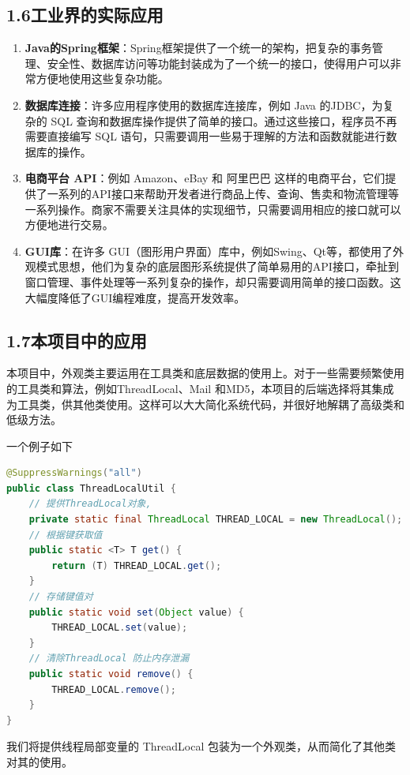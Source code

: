 \documentclass[24pt,a4paper]{article}%
\begin{document}
\subsection*{\songti 1.6工业界的实际应用}
\begin{enumerate}
    \item \textbf{Java的Spring框架}：Spring框架提供了一个统一的架构，把复杂的事务管理、安全性、数据库访问等功能封装成为了一个统一的接口，使得用户可以非常方便地使用这些复杂功能。
    \item \textbf{数据库连接}：许多应用程序使用的数据库连接库，例如 Java 的JDBC，为复杂的 SQL 查询和数据库操作提供了简单的接口。通过这些接口，程序员不再需要直接编写 SQL 语句，只需要调用一些易于理解的方法和函数就能进行数据库的操作。
    \item \textbf{电商平台 API}：例如 Amazon、eBay 和 阿里巴巴 这样的电商平台，它们提供了一系列的API接口来帮助开发者进行商品上传、查询、售卖和物流管理等一系列操作。商家不需要关注具体的实现细节，只需要调用相应的接口就可以方便地进行交易。
    \item \textbf{GUI库}：在许多 GUI（图形用户界面）库中，例如Swing、Qt等，都使用了外观模式思想，他们为复杂的底层图形系统提供了简单易用的API接口，牵扯到窗口管理、事件处理等一系列复杂的操作，却只需要调用简单的接口函数。这大幅度降低了GUI编程难度，提高开发效率。
\end{enumerate}

\subsection*{\songti 1.7本项目中的应用}
本项目中，外观类主要运用在工具类和底层数据的使用上。对于一些需要频繁使用的工具类和算法，例如ThreadLocal、Mail 和MD5，本项目的后端选择将其集成为工具类，供其他类使用。这样可以大大简化系统代码，并很好地解耦了高级类和低级方法。

一个例子如下
\begin{lstlisting}[language=Java]
@SuppressWarnings("all")
public class ThreadLocalUtil {
    // 提供ThreadLocal对象,
    private static final ThreadLocal THREAD_LOCAL = new ThreadLocal();
    // 根据键获取值
    public static <T> T get() {
        return (T) THREAD_LOCAL.get();
    }
    // 存储键值对
    public static void set(Object value) {
        THREAD_LOCAL.set(value);
    }
    // 清除ThreadLocal 防止内存泄漏
    public static void remove() {
        THREAD_LOCAL.remove();
    }
}
\end{lstlisting}
我们将提供线程局部变量的 ThreadLocal 包装为一个外观类，从而简化了其他类对其的使用。
\end{document}
